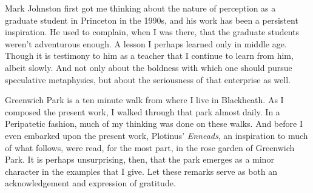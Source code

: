 Mark Johnston first got me thinking about the nature of perception as a graduate student in Princeton in the 1990s, and his work has been a persistent inspiration. He used to complain, when I was there, that the graduate students weren't adventurous enough. A lesson I perhaps learned only in middle age. Though it is testimony to him as a teacher that I continue to learn from him, albeit slowly. And not only about the boldness with which one should pursue speculative metaphysics, but about the seriousness of that enterprise as well.

Greenwich Park is a ten minute walk from where I live in Blackheath. As I composed the present work, I walked through that park almost daily. In a Peripatetic fashion, much of my thinking was done on these walks. And before I even embarked upon the present work, Plotinus' \emph{Enneads}, an inspiration to much of what follows, were read, for the most part, in the rose garden of Greenwich Park. It is perhaps unsurprising, then, that the park emerges as a minor character in the examples that I give. Let these remarks serve as both an acknowledgement and expression of gratitude.  


